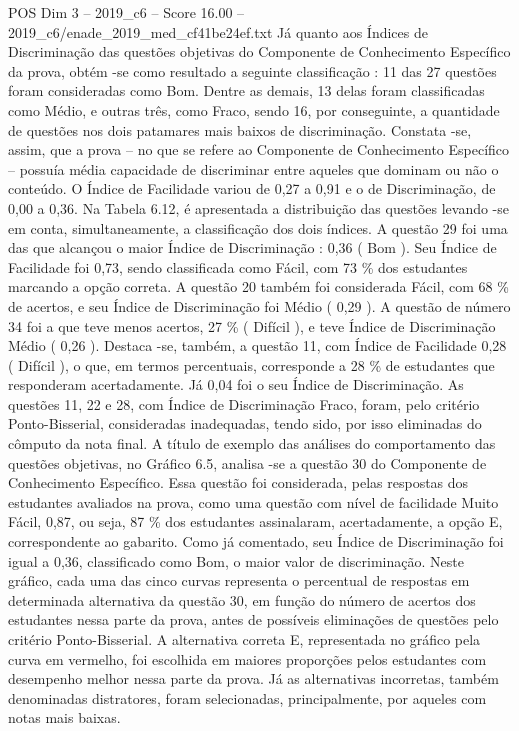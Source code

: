 \begin{textsample}{POS Dim 3 – 2019\_c6 – Score 16.00 – 2019\_c6/enade\_2019\_med\_cf41be24ef.txt}
Já quanto aos Índices de Discriminação das questões objetivas do Componente de Conhecimento Específico da prova, obtém -se como resultado a seguinte classificação : 11 das 27 questões foram consideradas como Bom.
Dentre as demais, 13 delas foram classificadas como Médio, e outras três, como Fraco, sendo 16, por conseguinte, a quantidade de questões nos dois patamares mais baixos de discriminação.
Constata -se, assim, que a prova – no que se refere ao Componente de Conhecimento Específico – possuía média capacidade de discriminar entre aqueles que dominam ou não o conteúdo.
O Índice de Facilidade variou de 0,27 a 0,91 e o de Discriminação, de 0,00 a 0,36.
Na Tabela 6.12, é apresentada a distribuição das questões levando -se em conta, simultaneamente, a classificação dos dois índices.
A questão 29 foi uma das que alcançou o maior Índice de Discriminação : 0,36 ( Bom ).
Seu Índice de Facilidade foi 0,73, sendo classificada como Fácil, com 73 \% dos estudantes marcando a opção correta.
A questão 20 também foi considerada Fácil, com 68 \% de acertos, e seu Índice de Discriminação foi Médio ( 0,29 ).
A questão de número 34 foi a que teve menos acertos, 27 \% ( Difícil ), e teve Índice de Discriminação Médio ( 0,26 ).
Destaca -se, também, a questão 11, com Índice de Facilidade 0,28 ( Difícil ), o que, em termos percentuais, corresponde a 28 \% de estudantes que responderam acertadamente.
Já 0,04 foi o seu Índice de Discriminação.
As questões 11, 22 e 28, com Índice de Discriminação Fraco, foram, pelo critério Ponto-Bisserial, consideradas inadequadas, tendo sido, por isso eliminadas do cômputo da nota final.
A título de exemplo das análises do comportamento das questões objetivas, no Gráfico 6.5, analisa -se a questão 30 do Componente de Conhecimento Específico.
Essa questão foi considerada, pelas respostas dos estudantes avaliados na prova, como uma questão com nível de facilidade Muito Fácil, 0,87, ou seja, 87 \% dos estudantes assinalaram, acertadamente, a opção E, correspondente ao gabarito.
Como já comentado, seu Índice de Discriminação foi igual a 0,36, classificado como Bom, o maior valor de discriminação.
Neste gráfico, cada uma das cinco curvas representa o percentual de respostas em determinada alternativa da questão 30, em função do número de acertos dos estudantes nessa parte da prova, antes de possíveis eliminações de questões pelo critério Ponto-Bisserial.
A alternativa correta E, representada no gráfico pela curva em vermelho, foi escolhida em maiores proporções pelos estudantes com desempenho melhor nessa parte da prova.
Já as alternativas incorretas, também denominadas distratores, foram selecionadas, principalmente, por aqueles com notas mais baixas.

\end{textsample}
